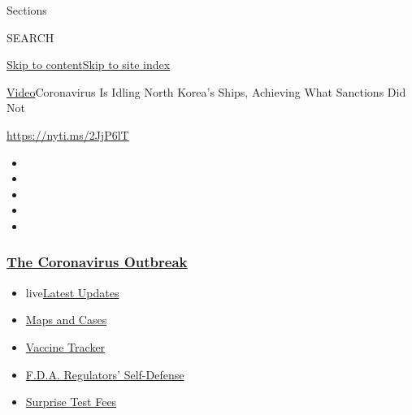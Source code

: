Sections

SEARCH

\protect\hyperlink{site-content}{Skip to
content}\protect\hyperlink{site-index}{Skip to site index}

\href{/video}{Video}\textbar{}Coronavirus Is Idling North Korea's Ships,
Achieving What Sanctions Did Not

\url{https://nyti.ms/2JjP6lT}

\begin{itemize}
\item
\item
\item
\item
\item
\end{itemize}

\hypertarget{the-coronavirus-outbreak}{%
\subsubsection{\texorpdfstring{\href{https://www.nytimes3xbfgragh.onion/news-event/coronavirus?name=styln-coronavirus-national\&region=TOP_BANNER\&block=storyline_menu_recirc\&action=click\&pgtype=Article\&impression_id=ea9a9db0-f4b9-11ea-9d18-57f86178db87\&variant=undefined}{The
Coronavirus
Outbreak}}{The Coronavirus Outbreak}}\label{the-coronavirus-outbreak}}

\begin{itemize}
\tightlist
\item
  live\href{https://www.nytimes3xbfgragh.onion/2020/09/11/world/covid-19-coronavirus.html?name=styln-coronavirus-national\&region=TOP_BANNER\&block=storyline_menu_recirc\&action=click\&pgtype=Article\&impression_id=ea9a9db1-f4b9-11ea-9d18-57f86178db87\&variant=undefined}{Latest
  Updates}
\item
  \href{https://www.nytimes3xbfgragh.onion/interactive/2020/us/coronavirus-us-cases.html?name=styln-coronavirus-national\&region=TOP_BANNER\&block=storyline_menu_recirc\&action=click\&pgtype=Article\&impression_id=ea9ac4c0-f4b9-11ea-9d18-57f86178db87\&variant=undefined}{Maps
  and Cases}
\item
  \href{https://www.nytimes3xbfgragh.onion/interactive/2020/science/coronavirus-vaccine-tracker.html?name=styln-coronavirus-national\&region=TOP_BANNER\&block=storyline_menu_recirc\&action=click\&pgtype=Article\&impression_id=ea9ac4c1-f4b9-11ea-9d18-57f86178db87\&variant=undefined}{Vaccine
  Tracker}
\item
  \href{https://www.nytimes3xbfgragh.onion/2020/09/10/us/politics/fda-coronavirus-vaccine.html?name=styln-coronavirus-national\&region=TOP_BANNER\&block=storyline_menu_recirc\&action=click\&pgtype=Article\&impression_id=ea9ac4c2-f4b9-11ea-9d18-57f86178db87\&variant=undefined}{F.D.A.
  Regulators' Self-Defense}
\item
  \href{https://www.nytimes3xbfgragh.onion/2020/09/09/upshot/coronavirus-surprise-test-fees.html?name=styln-coronavirus-national\&region=TOP_BANNER\&block=storyline_menu_recirc\&action=click\&pgtype=Article\&impression_id=ea9ac4c3-f4b9-11ea-9d18-57f86178db87\&variant=undefined}{Surprise
  Test Fees}
\end{itemize}


